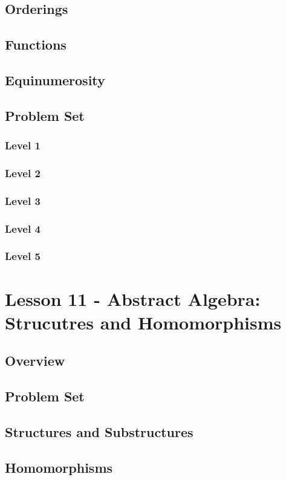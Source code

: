 \documentclass{article}
\begin{document}
\begin{theorem}
\subsection{Orderings}
\subsection{Functions}
\subsection{Equinumerosity}
\subsection{Problem Set}
\subsubsection{Level 1}
\subsubsection{Level 2}
\subsubsection{Level 3}
\subsubsection{Level 4}
\subsubsection{Level 5}
\pagebreak

\section{Lesson 11 - Abstract Algebra: Strucutres and Homomorphisms}
\subsection{Overview}
\subsection{Problem Set}
\subsection{Structures and Substructures}
\subsection{Homomorphisms}

\end{theorem}
\end{document}
